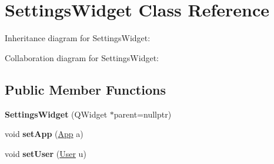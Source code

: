 \hypertarget{classSettingsWidget}{}\section{Settings\+Widget Class Reference}
\label{classSettingsWidget}


Inheritance diagram for Settings\+Widget\+:


Collaboration diagram for Settings\+Widget\+:
\subsection*{Public Member Functions}
\begin{DoxyCompactItemize}
\item 
\mbox{\label{classSettingsWidget_ad6b264d0455806fd3761a7f0e7b75dfd}} 
{\bfseries Settings\+Widget} (Q\+Widget $\ast$parent=nullptr)
\item 
\mbox{\label{classSettingsWidget_a4a666115a7fc0ea2beb4e2fd10e95357}} 
void {\bfseries set\+App} (\hyperlink{classApp}{App} a)
\item 
\mbox{\label{classSettingsWidget_a1719a95b45d747002548659206793ddd}} 
void {\bfseries set\+User} (\hyperlink{classUser}{User} u)
\end{DoxyCompactItemize}
